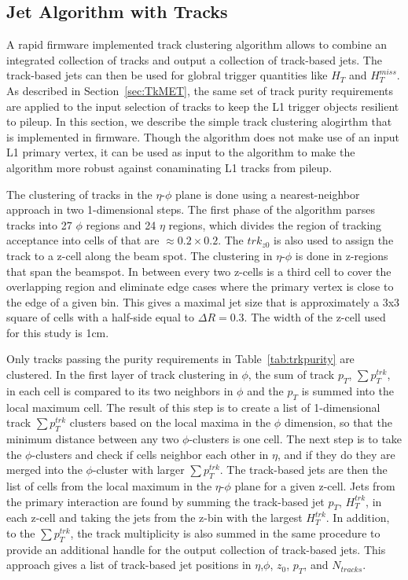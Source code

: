 \subsection{Jet Algorithm with Tracks}
\label{sec:TrkJets}

A rapid firmware implemented track clustering algorithm allows to combine an integrated collection of tracks and output a collection of track-based jets. The track-based jets can then be used for globral trigger quantities like $H_{T}$ and $H_{T}^{miss}$. As described in Section~\ref{sec:TkMET}, the same set of track purity requirements are applied to the input selection of tracks to keep the L1 trigger objects resilient to pileup. In this section, we describe the simple track clustering alogirthm that is implemented in firmware. Though the algorithm does not make use of an input L1 primary vertex, it can be used as input to the algorithm to make the algorithm more robust against conaminating L1 tracks from pileup. 

The clustering of tracks in the $\eta$-$\phi$ plane is done using a nearest-neighbor approach in two 1-dimensional steps. The first phase of the algorithm parses tracks into 27 $\phi$ regions and 24 $\eta$ regions, which divides the region of tracking acceptance into cells of that are $\approx 0.2\times 0.2$. The $trk_{z0} $ is also used to assign the track to a z-cell along the beam spot. The clustering in $\eta$-$\phi$ is done in z-regions that span the beamspot. In between every two z-cells is a third cell to cover the overlapping region and eliminate edge cases where the primary vertex is close to the edge of a given bin. This gives a maximal jet size that is approximately a 3x3 square of cells with a half-side equal to $\Delta R=0.3$. The width of the z-cell used for this study is 1cm. 

 Only tracks passing the purity requirements in Table~\ref{tab:trkpurity} are clustered. In the first layer of track clustering in $\phi$, the sum of track $p_{T}$, $\sum p_{T}^{trk}$, in each cell is compared to its two neighbors in $\phi$ and the $p_{T}$ is summed into the local maximum cell. The result of this step is to create a list of 1-dimensional track $\sum p_{T}^{trk}$ clusters based on the local maxima in the $\phi$ dimension, so that the minimum distance between any two $\phi$-clusters is one cell. The next step is to take the $\phi$-clusters and check if cells neighbor each other in $\eta$, and if they do they are merged into the $
\phi$-cluster with larger $\sum p_{T}^{trk}$. The track-based jets are then the list of cells from the local maximum in the $\eta$-$\phi$ plane for a given z-cell. Jets from the primary interaction are found by summing the track-based jet $p_{T}$, $H_{T}^{trk}$, in each z-cell and taking the jets from the z-bin with the largest $H_{T}^{trk}$.  In addition, to the $\sum p_{T}^{trk}$, the track multiplicity is also summed in the same procedure to provide an additional handle for the output collection of track-based jets. This approach gives a list of track-based jet positions in $\eta$,$\phi$, $z_{0}$, $p_{T}$, and $N_{tracks}$.





